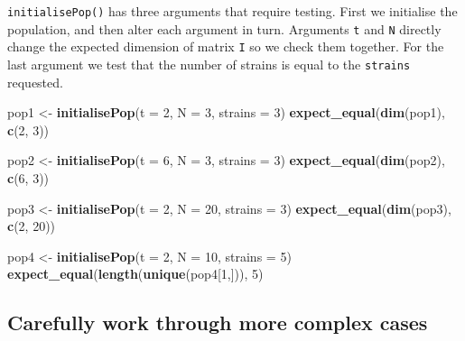 \documentclass[10pt,letterpaper]{article}
\newenvironment{Shaded}{\begin{snugshade}}{\end{snugshade}}
\newcommand{\DataTypeTok}[1]{\textcolor[rgb]{0.13,0.29,0.53}{#1}}
\newcommand{\DecValTok}[1]{\textcolor[rgb]{0.00,0.00,0.81}{#1}}
\newcommand{\KeywordTok}[1]{\textcolor[rgb]{0.13,0.29,0.53}{\textbf{#1}}}
\newcommand{\NormalTok}[1]{#1}
\newcommand{\StringTok}[1]{\textcolor[rgb]{0.31,0.60,0.02}{#1}}
\begin{document}
\texttt{initialisePop()} has three arguments that require testing.
First we initialise the population, and then alter each argument in turn.
Arguments \texttt{t} and \texttt{N} directly change the expected dimension of matrix \texttt{I} so we check them together.
For the last argument we test that the number of strains is equal to the \texttt{strains} requested.
\newline
{}\label{test_all_args}

\begin{Shaded}
\begin{Highlighting}[]
\NormalTok{pop1 <-}\StringTok{ }\KeywordTok{initialisePop}\NormalTok{(}\DataTypeTok{t =} \DecValTok{2}\NormalTok{, }\DataTypeTok{N =} \DecValTok{3}\NormalTok{, }\DataTypeTok{strains =} \DecValTok{3}\NormalTok{) }
\KeywordTok{expect_equal}\NormalTok{(}\KeywordTok{dim}\NormalTok{(pop1), }\KeywordTok{c}\NormalTok{(}\DecValTok{2}\NormalTok{, }\DecValTok{3}\NormalTok{))}

\NormalTok{pop2 <-}\StringTok{ }\KeywordTok{initialisePop}\NormalTok{(}\DataTypeTok{t =} \DecValTok{6}\NormalTok{, }\DataTypeTok{N =} \DecValTok{3}\NormalTok{, }\DataTypeTok{strains =} \DecValTok{3}\NormalTok{) }
\KeywordTok{expect_equal}\NormalTok{(}\KeywordTok{dim}\NormalTok{(pop2), }\KeywordTok{c}\NormalTok{(}\DecValTok{6}\NormalTok{, }\DecValTok{3}\NormalTok{))}

\NormalTok{pop3 <-}\StringTok{ }\KeywordTok{initialisePop}\NormalTok{(}\DataTypeTok{t =} \DecValTok{2}\NormalTok{, }\DataTypeTok{N =} \DecValTok{20}\NormalTok{, }\DataTypeTok{strains =} \DecValTok{3}\NormalTok{) }
\KeywordTok{expect_equal}\NormalTok{(}\KeywordTok{dim}\NormalTok{(pop3), }\KeywordTok{c}\NormalTok{(}\DecValTok{2}\NormalTok{, }\DecValTok{20}\NormalTok{))}

\NormalTok{pop4 <-}\StringTok{ }\KeywordTok{initialisePop}\NormalTok{(}\DataTypeTok{t =} \DecValTok{2}\NormalTok{, }\DataTypeTok{N =} \DecValTok{10}\NormalTok{, }\DataTypeTok{strains =} \DecValTok{5}\NormalTok{) }
\KeywordTok{expect_equal}\NormalTok{(}\KeywordTok{length}\NormalTok{(}\KeywordTok{unique}\NormalTok{(pop4[}\DecValTok{1}\NormalTok{,])), }\DecValTok{5}\NormalTok{)}
\end{Highlighting}
\end{Shaded}

\hypertarget{complexcases}{%
\subsection*{Carefully work through more complex cases}\label{complexcases}}
\end{document}
